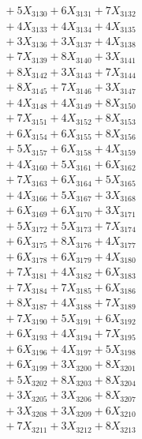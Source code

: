 \documentclass[a4paper,10pt]{article}
\begin{document}
{\begin{align}
&\;  + 5 X_{3130} + 6 X_{3131} + 7 X_{3132} \\[0.3ex]
&\;  + 4 X_{3133} + 4 X_{3134} + 4 X_{3135} \\[0.3ex]
&\;  + 3 X_{3136} + 3 X_{3137} + 4 X_{3138} \\[0.3ex]
&\;  + 7 X_{3139} + 8 X_{3140} + 3 X_{3141} \\[0.3ex]
&\;  + 8 X_{3142} + 3 X_{3143} + 7 X_{3144} \\[0.3ex]
&\;  + 8 X_{3145} + 7 X_{3146} + 3 X_{3147} \\[0.3ex]
&\;  + 4 X_{3148} + 4 X_{3149} + 8 X_{3150} \\[0.3ex]
&\;  + 7 X_{3151} + 4 X_{3152} + 8 X_{3153} \\[0.3ex]
&\;  + 6 X_{3154} + 6 X_{3155} + 8 X_{3156} \\[0.3ex]
&\;  + 5 X_{3157} + 6 X_{3158} + 4 X_{3159} \\[0.5ex]\allowbreak
&\;  + 4 X_{3160} + 5 X_{3161} + 6 X_{3162} \\[0.3ex]
&\;  + 7 X_{3163} + 6 X_{3164} + 5 X_{3165} \\[0.3ex]
&\;  + 4 X_{3166} + 5 X_{3167} + 3 X_{3168} \\[0.3ex]
&\;  + 6 X_{3169} + 6 X_{3170} + 3 X_{3171} \\[0.3ex]
&\;  + 5 X_{3172} + 5 X_{3173} + 7 X_{3174} \\[0.3ex]
&\;  + 6 X_{3175} + 8 X_{3176} + 4 X_{3177} \\[0.3ex]
&\;  + 6 X_{3178} + 6 X_{3179} + 4 X_{3180} \\[0.3ex]
&\;  + 7 X_{3181} + 4 X_{3182} + 6 X_{3183} \\[0.3ex]
&\;  + 7 X_{3184} + 7 X_{3185} + 6 X_{3186} \\[0.3ex]
&\;  + 8 X_{3187} + 4 X_{3188} + 7 X_{3189} \\[0.5ex]\allowbreak
&\;  + 7 X_{3190} + 5 X_{3191} + 6 X_{3192} \\[0.3ex]
&\;  + 6 X_{3193} + 4 X_{3194} + 7 X_{3195} \\[0.3ex]
&\;  + 6 X_{3196} + 4 X_{3197} + 5 X_{3198} \\[0.3ex]
&\;  + 6 X_{3199} + 3 X_{3200} + 8 X_{3201} \\[0.3ex]
&\;  + 5 X_{3202} + 8 X_{3203} + 8 X_{3204} \\[0.3ex]
&\;  + 3 X_{3205} + 3 X_{3206} + 8 X_{3207} \\[0.3ex]
&\;  + 3 X_{3208} + 3 X_{3209} + 6 X_{3210} \\[0.3ex]
&\;  + 7 X_{3211} + 3 X_{3212} + 8 X_{3213} \\[0.3ex]

\end{align}}
\end{document}
